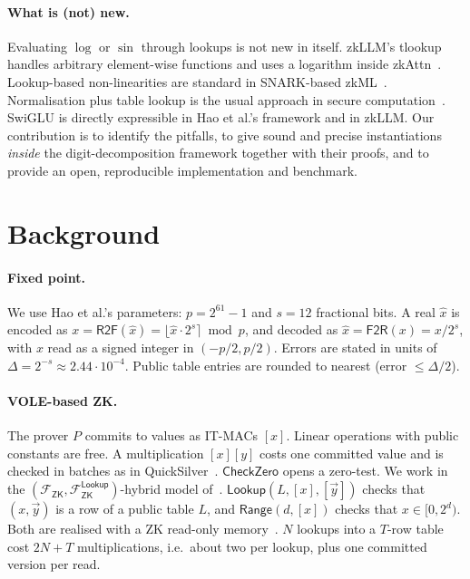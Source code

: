 \documentclass[10pt,twocolumn]{article}
\theoremstyle{remark}
\newcommand{\au}[1]{[#1]}
\newcommand{\Fzk}{\mathcal{F}_{\mathsf{ZK}}}
\newcommand{\Flk}{\mathcal{F}^{\mathsf{Lookup}}_{\mathsf{ZK}}}
\newcommand{\RtoF}{\mathsf{R2F}}
\newcommand{\FtoR}{\mathsf{F2R}}
\newcommand{\Rng}{\mathsf{Range}}
\newcommand{\Lk}{\mathsf{Lookup}}
\newcommand{\CZ}{\mathsf{CheckZero}}
\newcommand{\ulp}{\Delta}
\begin{document}
\paragraph{What is (not) new.} Evaluating $\log$ or $\sin$ through lookups is not new in itself.
zkLLM's \textsf{tlookup} handles arbitrary element-wise functions and uses a logarithm inside
zkAttn~\cite{sun2024zkllm}. Lookup-based non-linearities are standard in SNARK-based
zkML~\cite{kang2022scaling}. Normalisation plus table lookup is the usual approach in secure
computation~\cite{rathee2021sirnn,aly2019benchmarking}. SwiGLU is directly expressible in
Hao et al.'s framework and in zkLLM. Our contribution is to identify the pitfalls, to give sound
and precise instantiations \emph{inside} the digit-decomposition framework together with their
proofs, and to provide an open, reproducible implementation and benchmark.

\section{Background}\label{sec:bg}

\paragraph{Fixed point.} We use Hao et al.'s parameters: $p=2^{61}-1$ and $s=12$ fractional bits. A
real $\hat x$ is encoded as $x=\RtoF(\hat x)=\lfloor\hat x\cdot2^s\rceil\bmod p$, and decoded as
$\hat x=\FtoR(x)=x/2^s$, with $x$ read as a signed integer in $(-p/2,p/2)$. Errors are stated in
units of $\ulp=2^{-s}\approx2.44\cdot10^{-4}$. Public table entries are rounded to nearest
(error $\le\ulp/2$).

\paragraph{VOLE-based ZK.} The prover $P$ commits to values as IT-MACs $\au{x}$. Linear operations
with public constants are free. A multiplication $\au{x}\au{y}$ costs one committed value and is
checked in batches as in QuickSilver~\cite{yang2021quicksilver}. $\CZ$ opens a zero-test. We work in
the $(\Fzk,\Flk)$-hybrid model of~\cite{hao2024scalable}. $\Lk(L,\au{x},\au{\vec y})$ checks that
$(x,\vec y)$ is a row of a public table $L$, and $\Rng(d,\au{x})$ checks that $x\in[0,2^d)$. Both are
realised with a ZK read-only memory~\cite{franzese2021ram}. $N$ lookups into a $T$-row table cost
$2N+T$ multiplications, i.e.\ about two per lookup, plus one committed version per read.
\end{document}
